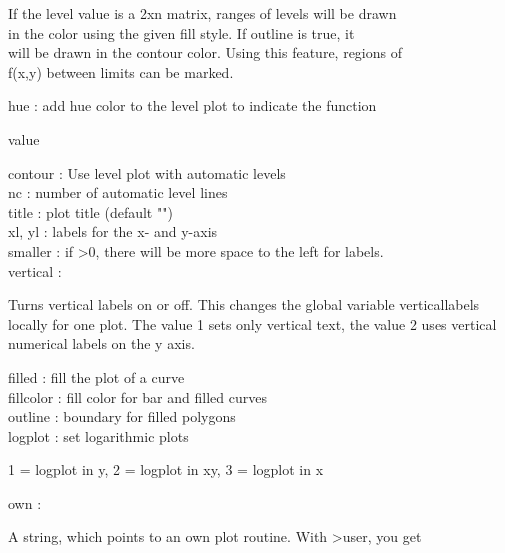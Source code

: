 \documentclass[a4paper,10pt]{article}
\begin{document}
\begin{eulernotebook}
\begin{eulercomment}
If the level value is a 2xn matrix, ranges of levels will be drawn\\
in the color using the given fill style. If outline is true, it\\
will be drawn in the contour color. Using this feature, regions of\\
f(x,y) between limits can be marked.

hue       : add hue color to the level plot to indicate the function\\
\end{eulercomment}
\begin{eulerttcomment}
            value
\end{eulerttcomment}
\begin{eulercomment}
contour   : Use level plot with automatic levels\\
nc        : number of automatic level lines\\
title     : plot title (default "")\\
xl, yl    : labels for the x- and y-axis\\
smaller   : if \textgreater{}0, there will be more space to the left for labels.\\
vertical  :\\
\end{eulercomment}
\begin{eulerttcomment}
  Turns vertical labels on or off. This changes the global variable
  verticallabels locally for one plot. The value 1 sets only vertical
  text, the value 2 uses vertical numerical labels on the y axis.
\end{eulerttcomment}
\begin{eulercomment}
filled    : fill the plot of a curve\\
fillcolor : fill color for bar and filled curves\\
outline   : boundary for filled polygons\\
logplot   : set logarithmic plots\\
\end{eulercomment}
\begin{eulerttcomment}
            1 = logplot in y,
            2 = logplot in xy,
            3 = logplot in x
\end{eulerttcomment}
\begin{eulercomment}
own       :\\
\end{eulercomment}
\begin{eulerttcomment}
  A string, which points to an own plot routine. With >user, you get

\end{eulerttcomment}
\end{eulernotebook}
\end{document}
